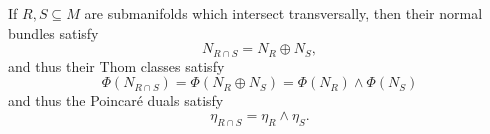 \eprop

If $R,S\subseteq M$ are submanifolds which intersect transversally, then their normal bundles satisfy
$$ N_{R\cap S} = N_R\oplus N_S , $$
and thus their Thom classes satisfy
$$ \Phi(N_{R\cap S}) = \Phi(N_R\oplus N_S) = \Phi(N_R)\wedge\Phi(N_S) $$
and thus the Poincar\'e duals satisfy
$$ \eta_{R\cap S} = \eta_R\wedge\eta_S . $$

